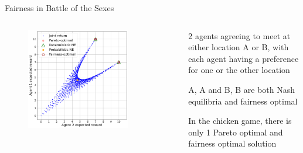 \begin{frame}{Fairness in Battle of the Sexes}

\begin{columns}
    \begin{column}{0.5\textwidth}
        \begin{figure}
        \centering
        \includegraphics[width=0.8\textwidth, height = 0.8\textheight, keepaspectratio]{images/chapter_4/battlesexes-po-frontier.pdf}
    \end{figure}
    \end{column}
    \begin{column}{0.5\textwidth}
        \centering
        \vspace{10pt}
        
        \gamebattle
        \vspace{10pt}
        
        \blist
            \item 2 agents agreeing to meet at either location A or B, with each agent having a preference for one or the other location
            \item A, A and B, B are both Nash equilibria and fairness optimal
            \item In the chicken game, there is only 1 Pareto optimal and fairness optimal solution
        \elist
    \end{column}
\end{columns}
    
\end{frame}

